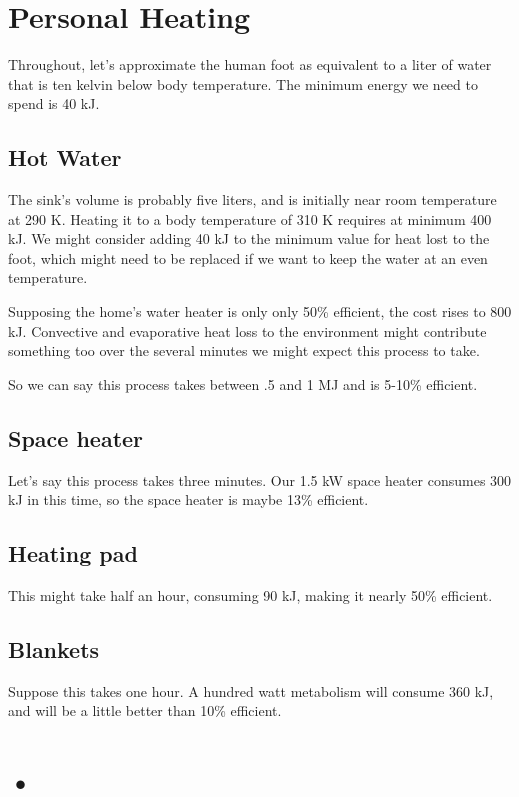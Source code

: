 \documentclass[12pt]{article}
\begin{document}
\section{Personal Heating}

Throughout, let's approximate the human foot as equivalent to a liter of water that is ten kelvin below body temperature. The minimum energy we need to spend is 40 kJ.

\subsection{Hot Water}

The sink's volume is probably five liters, and is initially near room temperature at 290 K. Heating it to a body temperature of 310 K requires at minimum 400 kJ. We might consider adding 40 kJ to the minimum value for heat lost to the foot, which might need to be replaced if we want to keep the water at an even temperature.

Supposing the home's water heater is only only 50\% efficient, the cost rises to 800 kJ. Convective and evaporative heat loss to the environment might contribute something too over the several minutes we might expect this process to take. 

So we can say this process takes between .5 and 1 MJ and is 5-10\% efficient.

\subsection{Space heater}

Let's say this process takes three minutes. Our 1.5 kW space heater consumes 300 kJ in this time, so the space heater is maybe 13\% efficient.

\subsection{Heating pad}

This might take half an hour, consuming 90 kJ, making it nearly 50\% efficient.

\subsection{Blankets}

Suppose this takes one hour. A hundred watt metabolism will consume 360 kJ, and will be a little better than 10\% efficient.


\section{•}
\end{document}

